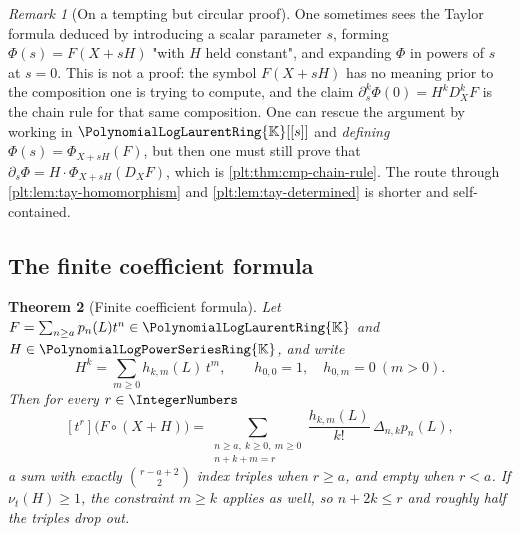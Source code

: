 \documentclass[11pt,oneside]{article}
\theoremstyle{plain}
\newtheorem{theorem}{Theorem}[section]
\theoremstyle{definition}
\theoremstyle{remark}
\newtheorem{remark}[theorem]{Remark}
\newcommand{\K}{\mathbb{K}}
\newcommand{\PLpow}{\PolynomialLogPowerSeriesRing{\K}}   %
\newcommand{\PLlau}{\PolynomialLogLaurentRing{\K}}       %
\newcommand{\ordt}{\nu_{t}}                              %
\newcommand{\DX}{D_{X}}                                  %
\newcommand{\shiftop}[2]{\Delta_{#1,#2}}                 %
\newcommand{\compose}{\mathbin{\circ}}
\begin{document}
\begin{remark}[On a tempting but circular proof]
One sometimes sees the Taylor formula deduced by introducing a scalar
parameter \(s\), forming \(\Phi(s)=F(X+sH)\) "with \(H\) held constant", and
expanding \(\Phi\) in powers of \(s\) at \(s=0\).  This is not a proof: the
symbol \(F(X+sH)\) has no meaning prior to the composition one is trying to
compute, and the claim
\(\partial_{s}^{k}\Phi(0)=H^{k}\DX^{k}F\) is the chain rule for that same
composition.  One can rescue the argument by working in
\(\PLlau[[s]]\) and \emph{defining} \(\Phi(s)=\Phi_{X+sH}(F)\), but then one
must still prove that \(\partial_{s}\Phi=H\cdot\Phi_{X+sH}(\DX F)\), which is
\cref{plt:thm:cmp-chain-rule}.  The route through
\cref{plt:lem:tay-homomorphism} and \cref{plt:lem:tay-determined} is shorter
and self-contained.
\end{remark}

\subsection{The finite coefficient formula}
\label{plt:sec:tay-coefficients}

\begin{theorem}[Finite coefficient formula]\label{plt:thm:tay-coefficients}
Let \(F=\sum_{n\ge a}p_n(L)t^{n}\in\PLlau\) and \(H\in\PLpow\), and write
\begin{equation}\label{plt:eq:tay-Hk-blocks}
 H^{k}=\sum_{m\ge0}h_{k,m}(L)\,t^{m},
 \qquad
 h_{0,0}=1,\quad h_{0,m}=0\ (m>0).
\end{equation}
Then for every \(r\in\IntegerNumbers\)
\begin{equation}\label{plt:eq:tay-coefficient-formula}
 [t^{r}]\bigl(F\compose(X+H)\bigr)
 =\sum_{\substack{n\ge a,\ k\ge0,\ m\ge0\\ n+k+m=r}}
   \frac{h_{k,m}(L)}{k!}\,\shiftop{n}{k}p_n(L),
\end{equation}
a sum with exactly \(\binom{r-a+2}{2}\) index triples when \(r\ge a\), and
empty when \(r<a\).  If \(\ordt(H)\ge1\), the constraint \(m\ge k\) applies as
well, so \(n+2k\le r\) and roughly half the triples drop out.
\end{theorem}
\end{document}
